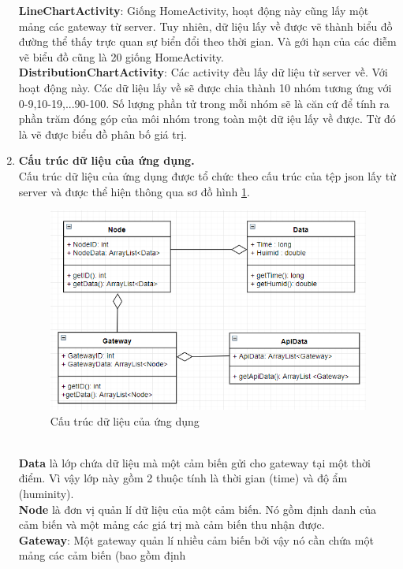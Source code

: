 \documentclass[a4paper]{article}
\begin{document}
\begin{enumerate}
			\textbf{LineChartActivity}: Giống HomeActivity, hoạt động này cũng lấy một mảng các gateway từ server. Tuy 					nhiên, dữ liệu lấy về được vẽ thành biểu đồ đường thể thấy trực quan sự biển đổi theo thời gian. Và gới hạn của các 				điễm vẽ biểu đồ cũng là 20 giống HomeActivity.\\
			\textbf{DistributionChartActivity}: Các activity đều lấy dữ liệu từ server về. Với hoạt động này. Các dữ liệu lấy về sẽ 			được chia thành 10 nhóm tương ứng với 0-9,10-19,...90-100. Số lượng phần tử trong mỗi nhóm sẽ là căn cứ để tính 				ra phần trăm đóng góp của môi nhóm trong toàn một dữ iệu lấy về được. Từ đó là vẽ được biểu đồ phân bố giá trị.\\
		\item \textbf{Cấu trúc dữ liệu của ứng dụng.}\\
			Cấu trúc dữ liệu của ứng dụng được tổ chức theo cấu trúc của tệp json lấy từ server và được thể hiện thông qua 				sơ đồ hình \ref{fig:dataStructureApp}.
			\begin{figure}[htp]
	    			\centering
	   			 \includegraphics[scale=0.5]{DataStructure.PNG}
	   			 \caption{Cấu trúc dữ liệu của ứng dụng}
	   			 \label{fig:dataStructureApp}
			\end{figure}\\
			 \textbf{Data} là lớp chứa dữ liệu mà một cảm biến gửi cho gateway tại một thời điểm. Vì vậy lớp này gồm 2 thuộc 				tính là thời gian (time) và độ ẩm (huminity).\\
			 \textbf{Node} là đơn vị quản lí dữ liệu của một cảm biến. Nó gồm định danh của cảm biến và một mảng các giá trị mà 			cảm biến thu nhận được.\\
			 \textbf{Gateway}: Một gateway quản lí nhiều cảm biến bởi vậy nó cần chứa một mảng các cảm biến (bao gồm định 

\end{enumerate}
\end{document}
